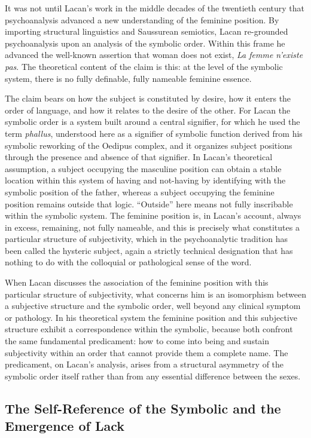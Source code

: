 \documentclass[11pt,a4paper]{article}
\begin{document}
It was not until Lacan's work in the middle decades of the twentieth century that psychoanalysis advanced a new understanding of the feminine position. By importing structural linguistics and Saussurean semiotics, Lacan re-grounded psychoanalysis upon an analysis of the symbolic order. Within this frame he advanced the well-known assertion that woman does not exist, \textit{La femme n'existe pas}. The theoretical content of the claim is this: at the level of the symbolic system, there is no fully definable, fully nameable feminine essence.

The claim bears on how the subject is constituted by desire, how it enters the order of language, and how it relates to the desire of the other. For Lacan the symbolic order is a system built around a central signifier, for which he used the term \textit{phallus}, understood here as a signifier of symbolic function derived from his symbolic reworking of the Oedipus complex, and it organizes subject positions through the presence and absence of that signifier. In Lacan's theoretical assumption, a subject occupying the masculine position can obtain a stable location within this system of having and not-having by identifying with the symbolic position of the father, whereas a subject occupying the feminine position remains outside that logic. ``Outside'' here means not fully inscribable within the symbolic system. The feminine position is, in Lacan's account, always in excess, remaining, not fully nameable, and this is precisely what constitutes a particular structure of subjectivity, which in the psychoanalytic tradition has been called the hysteric subject, again a strictly technical designation that has nothing to do with the colloquial or pathological sense of the word.

When Lacan discusses the association of the feminine position with this particular structure of subjectivity, what concerns him is an isomorphism between a subjective structure and the symbolic order, well beyond any clinical symptom or pathology. In his theoretical system the feminine position and this subjective structure exhibit a correspondence within the symbolic, because both confront the same fundamental predicament: how to come into being and sustain subjectivity within an order that cannot provide them a complete name. The predicament, on Lacan's analysis, arises from a structural asymmetry of the symbolic order itself rather than from any essential difference between the sexes.

\subsection{The Self-Reference of the Symbolic and the Emergence of Lack}
\end{document}

